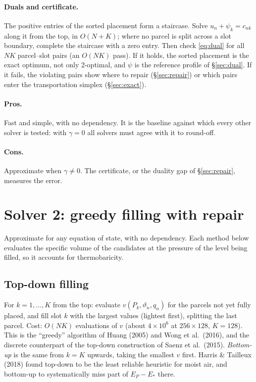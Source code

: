 \documentclass[11pt,a4paper]{article}
\newcommand{\vt}{\vartheta}
\begin{document}
\paragraph{Duals and certificate.} The positive entries of the sorted placement form a staircase. Solve $u_n+\psi_k=c_{nk}$ along
it from the top, in $O(N+K)$; where no parcel is split across a slot boundary, complete the staircase with a zero entry. Then
check \eqref{eq:dual} for all $NK$ parcel--slot pairs (an $O(NK)$ pass). If it holds, the sorted placement is the exact optimum, not only
2-optimal, and $\psi$ is the reference profile of \S\ref{sec:dual}. If it fails, the violating pairs show where to repair
(\S\ref{sec:repair}) or which pairs enter the transportation simplex (\S\ref{sec:exact}).

\paragraph{Pros.} Fast and simple, with no dependency. It is the baseline against which every other solver is tested:
with $\gamma=0$ all solvers must agree with it to round-off.
\paragraph{Cons.} Approximate when $\gamma\neq0$. The certificate, or the duality gap of \S\ref{sec:repair}, measures the
error.

\section{Solver 2: greedy filling with repair}\label{sec:greedy}
Approximate for any equation of state, with no dependency. Each method below evaluates the specific volume of the candidates
at the pressure of the level being filled, so it accounts for thermobaricity.

\subsection{Top-down filling}
For $k=1,\dots,K$ from the top: evaluate $v(P_k,\vt_n,q_n)$ for the parcels not yet fully placed, and fill slot $k$ with the
largest values (lightest first), splitting the last parcel. Cost: $O(NK)$ evaluations of $v$ (about $4\times10^6$ at
$256\times128$, $K=128$). This is the ``greedy'' algorithm of Huang (2005) and Wong et al.\ (2016), and the discrete
counterpart of the top-down construction of Saenz et al.\ (2015). \emph{Bottom-up} is the same from $k=K$ upwards,
taking the smallest $v$ first. Harris \& Tailleux (2018) found top-down to be the least reliable heuristic for moist air,
and bottom-up to systematically miss part of $E_P-E_*$ there.
\end{document}
